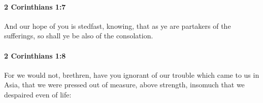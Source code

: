 		\paragraph{2 Corinthians 1:7} %
			\label{2CORINTHIANS-1-7}

			And our hope of you is stedfast, knowing, that as ye are partakers of the sufferings, so shall ye be also of the consolation.

			\begin{framed}
			\scriptsize
				\begin{compactdesc}
					\item[SBLG] 
				\end{compactdesc}
			\end{framed}

		\paragraph{2 Corinthians 1:8} %
			\label{2CORINTHIANS-1-8}

			For we would not, brethren, have you ignorant of our trouble which came to us in Asia, that we were pressed out of measure, above strength, insomuch that we despaired even of life:

